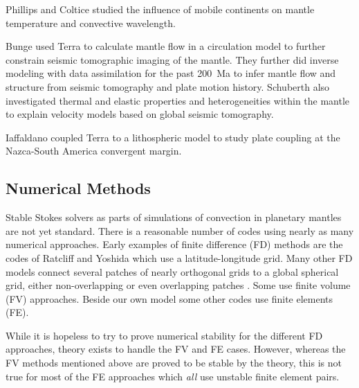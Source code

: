 \documentclass[times]{fldauth}
\begin{document}
Phillips and Coltice \cite{Phillips2005,Phillips2007,Coltice2007,Phillips2009,Phillips2010} studied the influence of mobile continents on mantle temperature and convective wavelength.

Bunge \cite{Bunge2001} used Terra to calculate mantle flow in a circulation model
to further constrain seismic tomographic imaging of the mantle. 
They further did inverse modeling with data assimilation for the past 200~Ma \cite{Bunge2002,Bunge2003} 
to infer mantle flow and structure from seismic tomography and plate motion history.
Schuberth \cite{Schuberth2009,Schuberth2009a} also investigated thermal and elastic properties and heterogeneities within the mantle to explain velocity models based on global seismic tomography.

Iaffaldano \cite{Iaffaldano2007} coupled Terra to a lithospheric model to study plate coupling at the Nazca-South America
convergent margin.
\subsection{Numerical Methods}

Stable Stokes solvers as parts of simulations of convection in planetary mantles are not yet standard.
There is a reasonable number of codes using nearly as many numerical approaches.  
Early examples of finite difference (FD) methods are the codes of Ratcliff and Yoshida \cite{Ratcliff1995,Yoshida1999} 
which use a latitude-longitude grid.
%
Many other FD models connect several patches of nearly orthogonal grids to a global spherical grid, either non-overlapping 
\cite{Zhong2000,Zhong2007a} 
or even overlapping patches \cite{Yoshida2006,Tackley2008}.
%
Some \cite{Harder2005,Stemmer2006} use finite volume (FV) approaches.
%
Beside our own model \cite{Baumgardner1985,Baumgardner1985a} some other codes \cite{Zhong2007a,Burstedde2009} use finite elements (FE).

While it is hopeless to try to prove numerical stability for the different FD approaches, theory exists to handle the FV and FE cases.
%
However, whereas the FV methods mentioned above are proved to be stable by the theory, this is not true for most of the FE approaches which \emph{all} use unstable finite element pairs.
\end{document}
